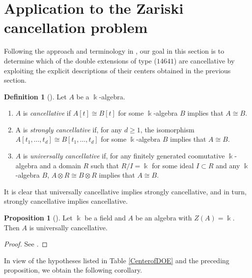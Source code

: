 \documentclass{amsart}
\theoremstyle{definition}
\newtheorem{definition}[theorem]{Definition}
\newtheorem{proposition}[theorem]{Proposition}
\theoremstyle{remark}
\numberwithin{equation}{section}
\begin{document}
\section{Application to the Zariski cancellation problem}\label{DAgeneralgenerators}

Following the approach and terminology in \cite{LezamaVenegas2020}, our goal in this section is to determine which of the double extensions of type {\rm (}$14641${\rm )} are cancellative by exploiting the explicit descriptions of their centers obtained in the previous section.

\begin{definition}[{\cite[Definition 4.1]{LezamaVenegas2020}}]
Let $A$ be a $\Bbbk$-algebra.
\begin{enumerate}
    \item[\rm (i)] $A$ is {\em cancellative} if $A[t]\cong B[t]$ for some $\Bbbk$-algebra $B$ implies that $A \cong B$.
    \item[\rm (ii)] A is {\em strongly cancellative} if, for any $d \geq 1$, the isomorphism $A[t_1, \ldots, t_d]\cong B[t_1,\ldots, t_d]$ for some $\Bbbk$-algebra $B$ implies that $A \cong B$.
    \item[\rm (iii)] $A$ is {\em universally cancellative} if, for any finitely generated coomutative $\Bbbk$-algebra and a domain $R$ such that $R/I=\Bbbk$ for some ideal $I \subset R$ and any $\Bbbk$-algebra $B$, $A \otimes R \cong B \otimes R$ implies that $A \cong B$.
\end{enumerate}
It is clear that universally cancellative implies strongly cancellative, and in turn, strongly cancellative implies cancellative.
\end{definition}

\begin{proposition}[{\cite[Proposition 4.2]{LezamaVenegas2020}}]
Let $\Bbbk$ be a field and $A$ be an algebra with $Z(A)=\Bbbk$. Then $A$ is universally cancellative.
\end{proposition}
\begin{proof}
    See \cite[Proposition 1.3]{BellZhang2017}.
\end{proof}

In view of the hypotheses listed in Table \ref{CenterofDOE} and the preceding proposition, we obtain the following corollary.
\end{document}
